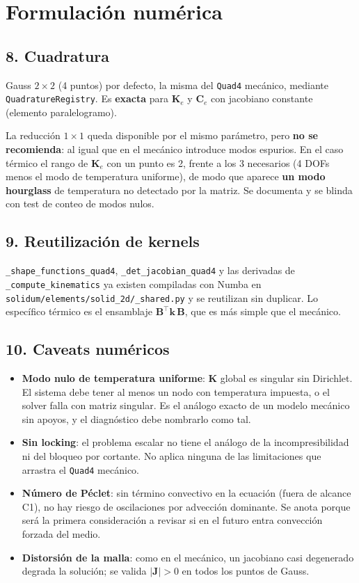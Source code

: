 \documentclass[11pt,letterpaper,oneside]{report}
\begin{document}
\section{Formulación numérica}

\subsection{8. Cuadratura}

Gauss $2\times2$ (4 puntos) por defecto, la misma del \texttt{Quad4} mecánico, mediante \texttt{QuadratureRegistry}. Es \textbf{exacta} para $\mathbf K_e$ y $\mathbf C_e$ con jacobiano constante (elemento paralelogramo).

La reducción $1\times1$ queda disponible por el mismo parámetro, pero \textbf{no se recomienda}: al igual que en el mecánico introduce modos espurios. En el caso térmico el rango de $\mathbf K_e$ con un punto es 2, frente a los 3 necesarios (4 DOFs menos el modo de temperatura uniforme), de modo que aparece \textbf{un modo hourglass} de temperatura no detectado por la matriz. Se documenta y se blinda con test de conteo de modos nulos.

\subsection{9. Reutilización de kernels}

\texttt{\_shape\_functions\_quad4}, \texttt{\_det\_jacobian\_quad4} y las derivadas de \texttt{\_compute\_kinematics} ya existen compiladas con Numba en \texttt{solidum/elements/solid\_2d/\_shared.py} y se reutilizan sin duplicar. Lo específico térmico es el ensamblaje $\mathbf B^\top\mathbf k\,\mathbf B$, que es más simple que el mecánico.

\subsection{10. Caveats numéricos}

\begin{itemize}
  \item \textbf{Modo nulo de temperatura uniforme}: $\mathbf K$ global es singular sin Dirichlet. El sistema debe tener al menos un nodo con temperatura impuesta, o el solver falla con matriz singular. Es el análogo exacto de un modelo mecánico sin apoyos, y el diagnóstico debe nombrarlo como tal.
  \item \textbf{Sin locking}: el problema escalar no tiene el análogo de la incompresibilidad ni del bloqueo por cortante. No aplica ninguna de las limitaciones que arrastra el \texttt{Quad4} mecánico.
  \item \textbf{Número de Péclet}: sin término convectivo en la ecuación (fuera de alcance C1), no hay riesgo de oscilaciones por advección dominante. Se anota porque será la primera consideración a revisar si en el futuro entra convección forzada del medio.
  \item \textbf{Distorsión de la malla}: como en el mecánico, un jacobiano casi degenerado degrada la solución; se valida $|\mathbf J| > 0$ en todos los puntos de Gauss.
\end{itemize}
\end{document}
